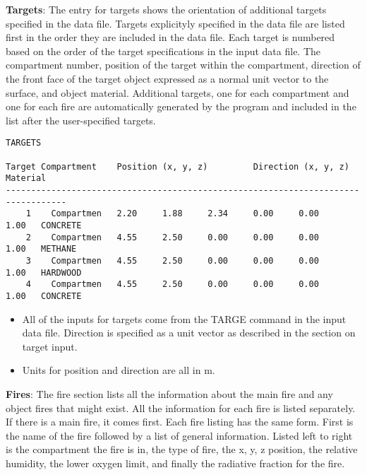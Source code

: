 \textbf{Targets}: The entry for targets shows the orientation of additional targets specified in the data file. Targets explicityly specified in the data file are listed first in the order they are included in the data file.  Each target is numbered based on the order of the target specifications in the input data file.  The compartment number, position of the target within the compartment, direction of the front face of the target object expressed as a normal unit vector to the surface, and object material. Additional targets, one for each compartment and one for each fire are automatically generated by the program and included in the list after the user-specified targets.

\begin{lstlisting}[basicstyle=\tiny]
TARGETS

Target Compartment    Position (x, y, z)         Direction (x, y, z)      Material
----------------------------------------------------------------------------------
    1    Compartmen   2.20     1.88     2.34     0.00     0.00     1.00   CONCRETE
    2    Compartmen   4.55     2.50     0.00     0.00     0.00     1.00   METHANE 
    3    Compartmen   4.55     2.50     0.00     0.00     0.00     1.00   HARDWOOD
    4    Compartmen   4.55     2.50     0.00     0.00     0.00     1.00   CONCRETE
\end{lstlisting}

\begin{itemize}
\item All of the inputs for targets come from the TARGE command in the input data file. Direction is specified as a unit vector as described in the section on target input.
\item Units for position and direction are all in m.
\end{itemize}

\textbf{Fires}: The fire section lists all the information about the main fire and any object fires that might exist.  All the information for each fire is listed separately.  If there is a main fire, it comes first.  Each fire listing has the same form.  First is the name of the fire followed by a list of general information.  Listed left to right is the compartment the fire is in, the type of fire, the x, y, z position, the relative humidity, the lower oxygen limit, and finally the radiative fraction for the fire.


